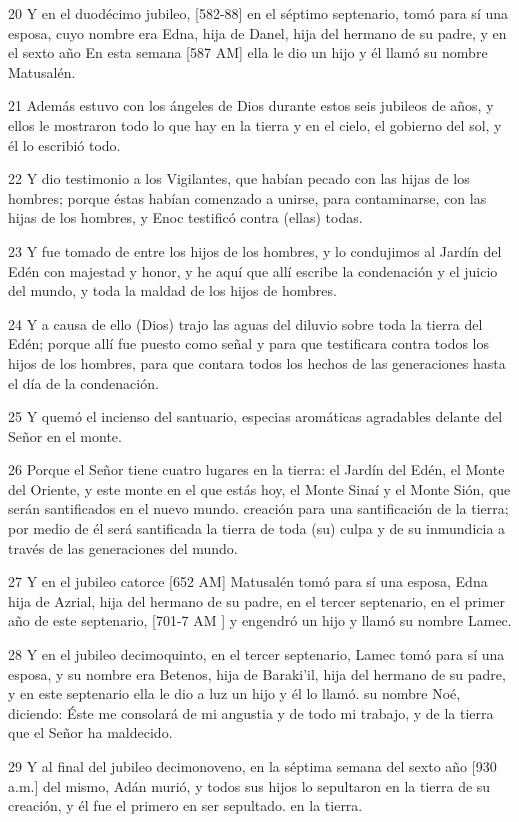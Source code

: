 \par 20 Y en el duodécimo jubileo, [582-88] en el séptimo septenario, tomó para sí una esposa, cuyo nombre era Edna, hija de Danel, hija del hermano de su padre, y en el sexto año En esta semana [587 AM] ella le dio un hijo y él llamó su nombre Matusalén.
\par 21 Además estuvo con los ángeles de Dios durante estos seis jubileos de años, y ellos le mostraron todo lo que hay en la tierra y en el cielo, el gobierno del sol, y él lo escribió todo.
\par 22 Y dio testimonio a los Vigilantes, que habían pecado con las hijas de los hombres; porque éstas habían comenzado a unirse, para contaminarse, con las hijas de los hombres, y Enoc testificó contra (ellas) todas.
\par 23 Y fue tomado de entre los hijos de los hombres, y lo condujimos al Jardín del Edén con majestad y honor, y he aquí que allí escribe la condenación y el juicio del mundo, y toda la maldad de los hijos de hombres.
\par 24 Y a causa de ello (Dios) trajo las aguas del diluvio sobre toda la tierra del Edén; porque allí fue puesto como señal y para que testificara contra todos los hijos de los hombres, para que contara todos los hechos de las generaciones hasta el día de la condenación.
\par 25 Y quemó el incienso del santuario, especias aromáticas agradables delante del Señor en el monte.
\par 26 Porque el Señor tiene cuatro lugares en la tierra: el Jardín del Edén, el Monte del Oriente, y este monte en el que estás hoy, el Monte Sinaí y el Monte Sión, que serán santificados en el nuevo mundo. creación para una santificación de la tierra; por medio de él será santificada la tierra de toda (su) culpa y de su inmundicia a través de las generaciones del mundo.
\par 27 Y en el jubileo catorce [652 AM] Matusalén tomó para sí una esposa, Edna hija de Azrial, hija del hermano de su padre, en el tercer septenario, en el primer año de este septenario, [701-7 AM ] y engendró un hijo y llamó su nombre Lamec.
\par 28 Y en el jubileo decimoquinto, en el tercer septenario, Lamec tomó para sí una esposa, y su nombre era Betenos, hija de Baraki'il, hija del hermano de su padre, y en este septenario ella le dio a luz un hijo y él lo llamó. su nombre Noé, diciendo: Éste me consolará de mi angustia y de todo mi trabajo, y de la tierra que el Señor ha maldecido.
\par 29 Y al final del jubileo decimonoveno, en la séptima semana del sexto año [930 a.m.] del mismo, Adán murió, y todos sus hijos lo sepultaron en la tierra de su creación, y él fue el primero en ser sepultado. en la tierra.
